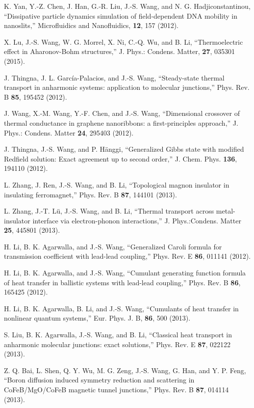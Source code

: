 \itm K. Yan, Y.-Z. Chen, J. Han, G.-R. Liu, J.-S. Wang, 
and N. G. Hadjiconstantinou, ``Dissipative particle dynamics simulation 
of field-dependent DNA mobility in nanoslits,'' 
Microfluidics and Nanofluidics, {\bf 12}, 157 (2012). 

\itm  X. Lu, J.-S. Wang, W. G. Morrel, X. Ni, C.-Q. Wu, and B. Li, 
``Thermoelectric effect in Aharonov-Bohm structures,'' 
J. Phys.: Condens. Matter, {\bf 27}, 035301 (2015). 

\itm J. Thingna, J. L. Garc\'ia-Palacios, and J.-S. Wang, 
``Steady-state thermal transport in anharmonic systems: application to 
molecular junctions,'' Phys. Rev. B {\bf 85}, 195452 (2012). 

\itm J. Wang, X.-M. Wang, Y.-F. Chen, and J.-S. Wang, 
``Dimensional crossover of thermal conductance in graphene nanoribbons: 
a first-principles approach,'' 
J. Phys.: Condens. Matter {\bf 24}, 295403 (2012). 

\itm J. Thingna, J.-S. Wang, and P. H\"anggi,
``Generalized Gibbs state with modified Redfield solution: 
Exact agreement up to second order,'' J. Chem. Phys. {\bf 136}, 194110 (2012). 

\itm L. Zhang, J. Ren, J.-S. Wang, and B. Li, 
``Topological magnon insulator in insulating ferromagnet,'' 
Phys. Rev. B {\bf 87}, 144101 (2013). 

\itm L. Zhang, J.-T. L\"u, J.-S. Wang, and B. Li, 
``Thermal transport across metal-insulator interface via electron-phonon 
interactions,'' J. Phys.:Condens. Matter {\bf 25}, 445801 (2013). 

\itm H. Li, B. K. Agarwalla, and J.-S. Wang, 
``Generalized Caroli formula for transmission coefficient with 
lead-lead coupling,'' Phys. Rev. E {\bf 86}, 011141 (2012). 

\itm H. Li, B. K. Agarwalla, and J.-S. Wang, ``Cumulant generating function 
formula of heat transfer in ballistic systems with lead-lead coupling,'' 
Phys. Rev. B {\bf 86}, 165425 (2012). 

\itm H. Li, B. K. Agarwalla, B. Li, and J.-S. Wang, 
``Cumulants of heat transfer in nonlinear quantum systems,'' 
Eur. Phys. J. B, {\bf 86}, 500 (2013). 

\itm S. Liu, B. K. Agarwalla, J.-S. Wang, and B. Li, 
``Classical heat transport in anharmonic molecular junctions: exact solutions,''
 Phys. Rev. E {\bf 87}, 022122 (2013). 

\itm Z. Q. Bai, L. Shen, Q. Y. Wu, M. G. Zeng, J.-S. Wang, G. Han, and Y. P. 
Feng, ``Boron diffusion induced symmetry reduction and scattering in 
CoFeB/MgO/CoFeB magnetic tunnel junctions,'' Phys. Rev. B {\bf 87}, 014114 (2013). 

